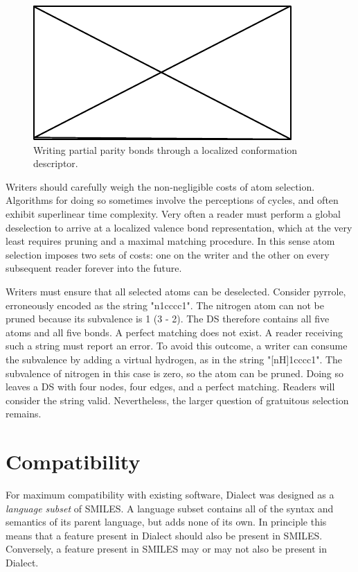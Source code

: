\documentclass{article}
\begin{document}
\begin{figure}
    \centering
    \includegraphics{filler}
    \caption{Writing partial parity bonds through a localized conformation descriptor.}
    \label{fig:writing-ppb}
\end{figure}

Writers should carefully weigh the non-negligible costs of atom selection. Algorithms for doing so sometimes involve the perceptions of cycles, and often exhibit superlinear time complexity. Very often a reader must perform a global deselection to arrive at a localized valence bond representation, which at the very least requires pruning and a maximal matching procedure. In this sense atom selection imposes two sets of costs: one on the writer and the other on every subsequent reader forever into the future.

Writers must ensure that all selected atoms can be deselected. Consider pyrrole, erroneously encoded as the string "n1cccc1". The nitrogen atom can not be pruned because its subvalence is 1 (3 - 2). The DS therefore contains all five atoms and all five bonds. A perfect matching does not exist. A reader receiving such a string must report an error. To avoid this outcome, a writer can consume the subvalence by adding a virtual hydrogen, as in the string "[nH]1cccc1". The subvalence of nitrogen in this case is zero, so the atom can be pruned. Doing so leaves a DS with four nodes, four edges, and a perfect matching. Readers will consider the string valid. Nevertheless, the larger question of gratuitous selection remains.

\section*{Compatibility}

For maximum compatibility with existing software, Dialect was designed as a \textit{language subset} of SMILES. A language subset contains all of the syntax and semantics of its parent language, but adds none of its own. In principle this means that a feature present in Dialect should also be present in SMILES. Conversely, a feature present in SMILES may or may not also be present in Dialect.
\end{document}
